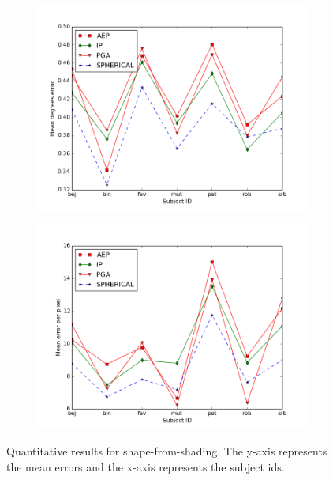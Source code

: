 \begin{figure}[ht!]
    \centering
    \begin{subfigure}{0.47\textwidth}
        \centering
        \includegraphics[width=\textwidth]{images/sfs-angle}
        \label{fig:sfs-angle}
    \end{subfigure}
    \;
    \begin{subfigure}{0.47\textwidth}
        \centering
        \includegraphics[width=\textwidth]{images/sfs-height}
        \label{fig:sfs-height}
    \end{subfigure}
    \caption{Quantitative results for shape-from-shading. The y-axis represents the mean errors and the x-axis represents the subject ids.}
    \label{fig:sfs-results-quant}
\end{figure}
